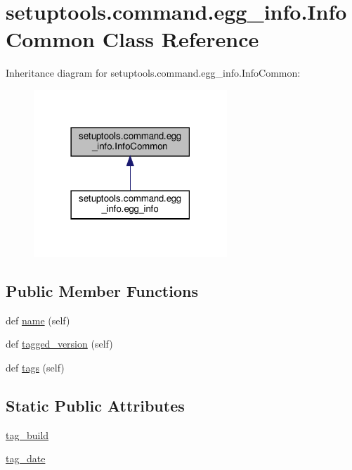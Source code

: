 \hypertarget{classsetuptools_1_1command_1_1egg__info_1_1InfoCommon}{}\section{setuptools.\+command.\+egg\+\_\+info.\+Info\+Common Class Reference}
\label{classsetuptools_1_1command_1_1egg__info_1_1InfoCommon}


Inheritance diagram for setuptools.\+command.\+egg\+\_\+info.\+Info\+Common\+:
\nopagebreak
\begin{figure}[H]
\begin{center}
\leavevmode
\includegraphics[width=206pt]{classsetuptools_1_1command_1_1egg__info_1_1InfoCommon__inherit__graph}
\end{center}
\end{figure}
\subsection*{Public Member Functions}
\begin{DoxyCompactItemize}
\item 
def \hyperlink{classsetuptools_1_1command_1_1egg__info_1_1InfoCommon_a13f1532df6e92fbd8ae68eb480808db2}{name} (self)
\item 
def \hyperlink{classsetuptools_1_1command_1_1egg__info_1_1InfoCommon_a5b67379d9236639690fdcce6f1884d42}{tagged\+\_\+version} (self)
\item 
def \hyperlink{classsetuptools_1_1command_1_1egg__info_1_1InfoCommon_a9d01045a03a1438d0f9e9e88855fbca0}{tags} (self)
\end{DoxyCompactItemize}
\subsection*{Static Public Attributes}
\begin{DoxyCompactItemize}
\item 
\hyperlink{classsetuptools_1_1command_1_1egg__info_1_1InfoCommon_a79a95a80b2b05a092ab8f3cc86cc12d9}{tag\+\_\+build}
\item 
\hyperlink{classsetuptools_1_1command_1_1egg__info_1_1InfoCommon_a951040c937bee297d3c375069878f526}{tag\+\_\+date}
\end{DoxyCompactItemize}
